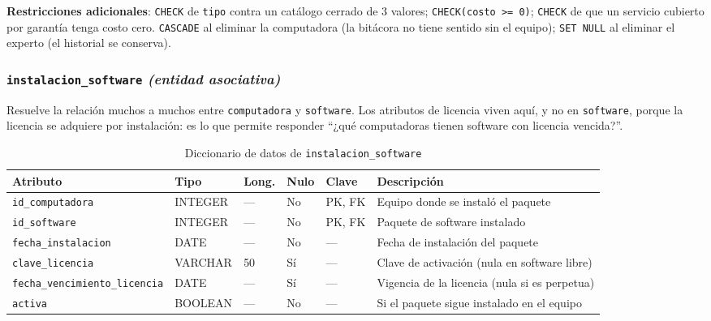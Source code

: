 \documentclass[10pt,a4paper]{article}
\begin{document}
\textbf{Restricciones adicionales}: \texttt{CHECK} de \texttt{tipo} contra un catálogo cerrado de 3 valores; \texttt{CHECK(costo >= 0)}; \texttt{CHECK} de que un servicio cubierto por garantía tenga costo cero. \texttt{CASCADE} al eliminar la computadora (la bitácora no tiene sentido sin el equipo); \texttt{SET NULL} al eliminar el experto (el historial se conserva).

\subsubsection{\texttt{instalacion\_software} \textit{(entidad asociativa)}}

Resuelve la relación muchos a muchos entre \texttt{computadora} y \texttt{software}. Los atributos de licencia viven aquí, y no en \texttt{software}, porque la licencia se adquiere por instalación: es lo que permite responder \enquote{¿qué computadoras tienen software con licencia vencida?}.

\begin{table}[H]
	\centering
	\footnotesize
	\begin{tabular}{p{3.9cm} | p{1.6cm} | p{0.8cm} | p{0.7cm} | p{1.3cm} | p{5.9cm}}\hline \hline
		\textbf{Atributo} & \textbf{Tipo} & \textbf{Long.} & \textbf{Nulo} & \textbf{Clave} & \textbf{Descripción} \\ \hline \hline
		\texttt{id\_computadora} & INTEGER & --- & No & PK, FK & Equipo donde se instaló el paquete \\ \hline
		\texttt{id\_software} & INTEGER & --- & No & PK, FK & Paquete de software instalado \\ \hline
		\texttt{fecha\_instalacion} & DATE & --- & No & --- & Fecha de instalación del paquete \\ \hline
		\texttt{clave\_licencia} & VARCHAR & 50 & Sí & --- & Clave de activación (nula en software libre) \\ \hline
		\texttt{fecha\_vencimiento\_licencia} & DATE & --- & Sí & --- & Vigencia de la licencia (nula si es perpetua) \\ \hline
		\texttt{activa} & BOOLEAN & --- & No & --- & Si el paquete sigue instalado en el equipo \\ \hline \hline
	\end{tabular}
	\caption{Diccionario de datos de \texttt{instalacion\_software}}
	\label{tabla:dic-instsw}
\end{table}
\end{document}

